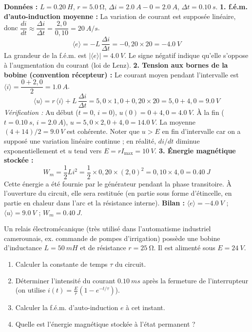 \documentclass[11pt]{article}
\begin{document}
\begin{exoresolu}
\textbf{Données :} $L = \SI{0,20}{H}$, $r = \SI{5,0}{\ohm}$, $\Delta i = \SI{2,0}{A} - 0 = \SI{2,0}{A}$, $\Delta t = \SI{0,10}{s}$.
\textbf{1. f.é.m. d'auto-induction moyenne :}
La variation de courant est supposée linéaire, donc $\dfrac{di}{dt} \approx \dfrac{\Delta i}{\Delta t} = \dfrac{2,0}{0,10} = \SI{20}{A/s}$.
\[
\langle e \rangle = -L\,\frac{\Delta i}{\Delta t} = -0,20 \times 20 = \SI{-4,0}{V}
\]
La grandeur de la f.é.m. est $|\langle e \rangle| = \SI{4,0}{V}$. Le signe négatif indique qu'elle s'oppose à l'augmentation du courant (loi de Lenz).
\textbf{2. Tension aux bornes de la bobine (convention récepteur) :}
Le courant moyen pendant l'intervalle est $\langle i \rangle = \dfrac{0 + 2,0}{2} = \SI{1,0}{A}$.
\[
\langle u \rangle = r\,\langle i \rangle + L\,\frac{\Delta i}{\Delta t} = 5,0 \times 1,0 + 0,20 \times 20 = 5,0 + 4,0 = \SI{9,0}{V}
\]
\textit{Vérification :} Au début ($t=0$, $i=0$), $u(0) = 0 + 4,0 = \SI{4,0}{V}$. À la fin ($t=\SI{0,10}{s}$, $i=\SI{2,0}{A}$), $u = 5,0\times 2,0 + 4,0 = \SI{14,0}{V}$. La moyenne $(4+14)/2 = \SI{9,0}{V}$ est cohérente. Noter que $u > E$ en fin d'intervalle car on a supposé une variation linéaire continue ; en réalité, $di/dt$ diminue exponentiellement et $u$ tend vers $E = r I_{\text{max}} = \SI{10}{V}$.
\textbf{3. Énergie magnétique stockée :}
\[
W_m = \frac{1}{2} L i^2 = \frac{1}{2} \times 0,20 \times (2,0)^2 = 0,10 \times 4,0 = \SI{0,40}{J}
\]
Cette énergie a été fournie par le générateur pendant la phase transitoire. À l'ouverture du circuit, elle sera restituée (en partie sous forme d'étincelle, en partie en chaleur dans l'arc et la résistance interne).
\tcblower
\textbf{Bilan :} $\langle e \rangle = \SI{-4,0}{V}$ ; $\langle u \rangle = \SI{9,0}{V}$ ; $W_m = \SI{0,40}{J}$.
\end{exoresolu}

\begin{exercice}
Un relais électromécanique (très utilisé dans l'automatisme industriel camerounais, ex. commande de pompes d'irrigation) possède une bobine d'inductance $L = \SI{50}{mH}$ et de résistance $r = \SI{25}{\ohm}$. Il est alimenté sous $E = \SI{24}{V}$.
\begin{enumerate}
\item Calculer la constante de temps $\tau$ du circuit.
\item Déterminer l'intensité du courant $\SI{0,10}{ms}$ après la fermeture de l'interrupteur (on utilise $i(t) = \frac{E}{r}(1 - e^{-t/\tau})$).
\item Calculer la f.é.m. d'auto-induction $e$ à cet instant.
\item Quelle est l'énergie magnétique stockée à l'état permanent ?
\end{enumerate}
\end{exercice}
\end{document}
